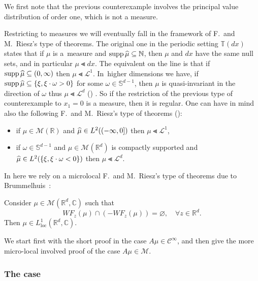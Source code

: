 \documentclass[AHL,Unicode,longabstracts,published]{cedram}
\DeclareMathOperator{\supp}{supp}
\DeclareMathOperator{\locc}{loc}
\newcommand{\bbC}{\mathbb{C}}
\newcommand{\bbN}{\mathbb{N}}
\newcommand{\bbT}{\mathbb{T}}
\newcommand{\bbR}{\mathbb{R}}
\newcommand{\bbS}{\mathbb{S}}
\newcommand{\clC}{\mathcal{C}}
\newcommand{\clM}{\mathcal{M}}
\newcommand{\clL}{\mathcal{L}}
\let\oldhat\hat
\renewcommand*{\hat}[1]{\mathchoice{\widehat{#1}}{\widehat{#1}}{\oldhat{#1}}{\oldhat{#1}}}
\let\oldforall\forall
\renewcommand*{\forall}{\mathrel{\oldforall}}
\begin{document}
We first note that the previous counterexample involves the principal value distribution of order one, which is not a measure.

Restricting to measures we will eventually fall in the framework of F.~and M.~Riesz's type of theorems. The original one in the periodic setting $\bbT(dx)$ states that if $\mu$ is a~measure and $\supp\hat{\mu}\subseteq \bbN$, then $\mu$ and $dx$ have the same null sets, and in particular $\mu\Lt dx$. The equivalent on the line is that if $\supp\hat{\mu}\subseteq (0,\infty)$ then $\mu\Lt \clL^1$. In~higher dimensions we have, if $\supp\hat{\mu}\subseteq \{\xi,\xi\cdot\omega>0\}$ for some $\omega\in\bbS^{d-1}$, then $\mu$ is quasi-invariant in the direction of $\omega$ thus $\mu\Lt \mathcal L^d$ (\cite{F}) . So if the restriction of the previous type of counterexample to $x_1=0$ is a measure, then it is regular. One can have in mind also the following F.~and M.~Riesz's type of theorems (\cite{Sh}):
\begin{itemize}
\item if $\mu\in\clM(\bbR)$ and $\hat\mu\in L^2((-\infty,0])$ then $\mu\Lt\clL^1$,
\item if $\omega\in\bbS^{d-1}$ and $\mu\in\clM(\bbR^d)$ is compactly supported and $\hat\mu\in L^2(\{\xi,\xi\cdot \omega<0\})$ then $\mu\Lt\clL^d$.
\end{itemize}
In here we rely on a microlocal F.~and M.~Riesz's type of theorems due to Brummelhuis~\cite{Br}:
\begin{theo} Consider $\mu\in\clM(\bbR^d,\bbC)$ such that
\begin{equation}\label{Br}
WF_z(\mu)\cap (-WF_z(\mu))=\varnothing,\quad \forall z\in\bbR^d.
\end{equation}
Then $\mu\in L^1_{\locc}(\bbR^d,\bbC)$.
\end{theo}

We start first with the short proof in the case $A\mu\in\clC^\infty$, and then give the more micro-local involved proof of the case $A\mu\in \clM$.

\subsubsection{The case \protect{\texorpdfstring{$A\mu\in\clC^\infty$}{A mu in C\^infty}}}
\end{document}
